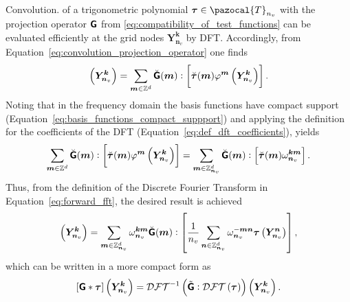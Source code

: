 Convolution. of a trigonometric polynomial \(\bm\tau \in \pazocal{T}_{n_v}\) with the projection operator \(\boldsymbol{\mathsf{G}}\) from \eqref{eq:compatibility_of_test_functions} can be evaluated efficiently at the grid nodes \(\bm Y_{\bm n_v}^{\bm  k}\) by DFT.
Accordingly, from Equation~\eqref{eq:convolution_projection_operator} one finds
\begin{equation}
[\boldsf{G} * \bm{\tau}]\left(\bm{Y}_{\bm n_v}^{\bm  k}\right) = \sum_{\bm  m \in \mathbb{Z}^{d}} \breve{\boldsf{G}}(\bm{ m}):\left[\breve{\bm{\tau}}(\bm{ m}) \varphi^{\bm  m}\left(\bm{Y}_{\bm n_v}^{\bm  k}\right)\right].
\end{equation}
Noting that in the frequency domain the basis functions have compact support (Equation~\eqref{eq:basis_functions_compact_suppport}) and applying the definition for the coefficients of the DFT (Equation~\eqref{eq:def_dft_coefficients}), yields
\begin{equation}
  \sum_{\bm  m \in \mathbb{Z}^{d}} \breve{\boldsymbol{\mathsf{G}}}(\bm{ m}):\left[\breve{\bm{\tau}}(\bm{ m}) \varphi^{\bm  m}\left(\bm{Y}_{\bm n_v}^{\bm  k}\right)\right] = \sum_{\bm  m \in \mathbb{Z}_{\bm n_v}^{d}}  \breve{\boldsymbol{\mathsf{G}}}(\bm{ m}):\left[\breve{\bm\tau}(\bm{ m}) \omega_{\bm n_v}^{\bm  k \bm  m}\right].
\end{equation}
Thus, from the definition of the Discrete Fourier Transform in Equation~\eqref{eq:forward_fft}, the desired result is achieved
\begin{equation}
[\boldsf{G} * \bm{\tau}]\left(\bm{Y}_{\bm n_v}^{\bm  k}\right) = \sum_{\bm  m \in \mathbb{Z}_{\bm n_v}^{d}} \omega_{\bm n_v}^{\bm  k \bm  m} \breve{\boldsf{G}}(\bm{ m}):\left[\frac{1}{n_v} \sum_{\bm  n \in \mathbb{Z}_{\bm n_v}^{d}}
\omega_{\bm n_v}^{-\bm  m \bm  n} \bm{\tau}\left(\bm{Y}_{\bm n_v}^{\bm  n}\right)\right],
\end{equation}
which can be written in a more compact form as
\begin{equation} \label{eq:main_computation_short}
[\boldsymbol{\mathsf{G}} * \bm{\tau}]\left(\bm{Y}_{\bm n_v}^{\bm  k}\right)= \mathcal{DFT}^{-1}\left(\tilde{\boldsymbol{\mathsf{G}}}:\mathcal{DFT}\left(\bm \tau\right)\right)\left(\bm{Y}_{\bm n_v}^{\bm  k}\right).
\end{equation}

